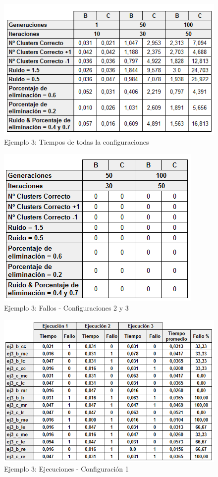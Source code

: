 \documentclass[conference,a4paper]{IEEEtran}
\begin{document}
\begin{figure}[H]
\centering
\includegraphics[scale=0.6]{Experimentacion/Ejemplo3/Ejemplo3Completo}
\caption{Ejemplo 3: Tiempos de todas la configuraciones\\}
\end{figure}

\begin{figure}[H]
\centering
\includegraphics[scale=0.7]{Experimentacion/Ejemplo3/Ejemplo3Fallos}
\caption{Ejemplo 3: Fallos - Configuraciones 2 y 3\\}
\end{figure}

\begin{figure}[H]
\centering
\includegraphics[scale=0.5]{Experimentacion/Ejemplo3/Ejemplo3Ejecuciones}
\caption{Ejemplo 3: Ejecuciones - Configuración 1\\}
\end{figure}
\end{document}

